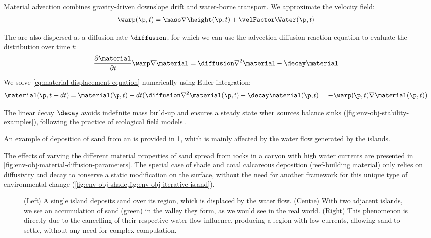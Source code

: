 Material advection combines gravity-driven downslope drift and water-borne transport. We approximate the velocity field:
\begin{align}
    \warp(\p, t) = \mass \nabla \height(\p, t) + \velFactor \Water(\p, t)
\end{align}

The  are also dispersed at a diffusion rate $\diffusion$, for which we can use the advection-diffusion-reaction equation to evaluate the distribution over time $t$:
\begin{align}
    \label{eq:material-displacement-equation}
    \frac{\partial \material}{\partial t} \warp \nabla \material = \diffusion \nabla^2 \material - \decay \material
\end{align}

We solve \eqref{eq:material-displacement-equation} numerically using Euler integration:
\begin{align}
    \material(\p, t + dt) &= \material(\p, t) + dt ( \diffusion \nabla^2 \material(\p, t) - \decay \material(\p, t) \ & - \warp(\p, t) \nabla \material(\p, t) ) \nonumber
\end{align}

The linear decay $\decay$ avoids indefinite mass build-up and ensures a steady state when sources balance sinks (\cref{fig:env-obj-stability-examples}), following the practice of ecological field models \cite{Seidl2012}.

An example of deposition of sand from an  is provided in \cref{fig:env-obj-double-island-sand-deposition}, which is mainly affected by the water flow generated by the islands.

The effects of varying the different material properties of sand spread from rocks in a canyon with high water currents are presented in \cref{fig:env-obj-material-diffusion-parameters}. The special case of shade and coral calcareous deposition (reef-building material) only relies on diffusivity and decay to conserve a static modification on the surface, without the need for another framework for this unique type of environmental change (\cref{fig:env-obj-shade,fig:env-obj-iterative-island}).

\begin{figure}
    \caption{(Left) A single island deposits sand over its region, which is displaced by the water flow. (Centre) With two adjacent islands, we see an accumulation of sand (green) in the valley they form, as we would see in the real world. (Right) This phenomenon is directly due to the cancelling of their respective water flow influence, producing a region with low currents, allowing sand to settle, without any need for complex computation.}
    \label{fig:env-obj-double-island-sand-deposition}
\end{figure}

